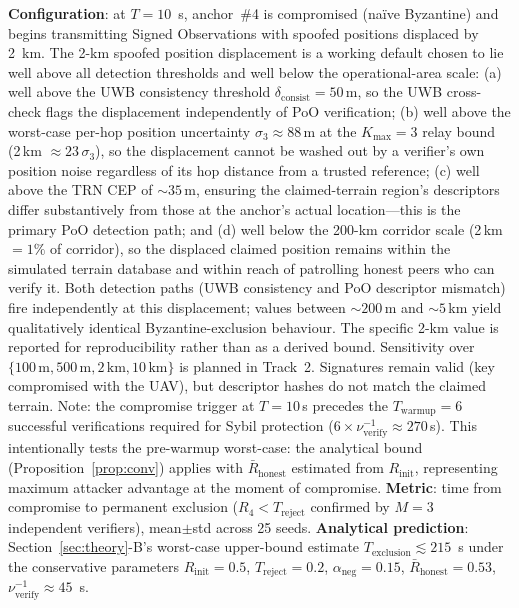 \documentclass[conference,10pt]{IEEEtran}
\begin{document}
\textbf{Configuration}: at $T{=}10$~s, anchor~\#4 is compromised (na\"ive Byzantine) and begins transmitting Signed Observations with spoofed positions displaced by 2~km. The 2-km spoofed position displacement is a working default chosen to lie well above all detection thresholds and well below the operational-area scale: (a) well above the UWB consistency threshold $\delta_\text{consist}=50$\,m, so the UWB cross-check flags the displacement independently of PoO verification; (b) well above the worst-case per-hop position uncertainty $\sigma_3 \approx 88$\,m at the $K_\text{max}=3$ relay bound (2\,km $\approx 23\,\sigma_3$), so the displacement cannot be washed out by a verifier's own position noise regardless of its hop distance from a trusted reference; (c) well above the TRN CEP of $\sim 35$\,m, ensuring the claimed-terrain region's descriptors differ substantively from those at the anchor's actual location---this is the primary PoO detection path; and (d) well below the 200-km corridor scale (2\,km $= 1\%$ of corridor), so the displaced claimed position remains within the simulated terrain database and within reach of patrolling honest peers who can verify it. Both detection paths (UWB consistency and PoO descriptor mismatch) fire independently at this displacement; values between $\sim 200$\,m and $\sim 5$\,km yield qualitatively identical Byzantine-exclusion behaviour. The specific 2-km value is reported for reproducibility rather than as a derived bound. Sensitivity over $\{100\,\text{m}, 500\,\text{m}, 2\,\text{km}, 10\,\text{km}\}$ is planned in Track~2. Signatures remain valid (key compromised with the UAV), but descriptor hashes do not match the claimed terrain. Note: the compromise trigger at $T=10$\,s precedes the $T_\text{warmup}=6$ successful verifications required for Sybil protection ($6\times \nu_\text{verify}^{-1}\approx 270$\,s). This intentionally tests the pre-warmup worst-case: the analytical bound (Proposition~\ref{prop:conv}) applies with $\bar{R}_\text{honest}$ estimated from $R_\text{init}$, representing maximum attacker advantage at the moment of compromise.
\textbf{Metric}: time from compromise to permanent exclusion ($R_4 < T_\text{reject}$ confirmed by $M{=}3$ independent verifiers), mean$\pm$std across 25 seeds.
\textbf{Analytical prediction}: Section~\ref{sec:theory}-B's worst-case upper-bound estimate $T_\text{exclusion}\lesssim 215$~s under the conservative parameters $R_\text{init}{=}0.5$, $T_\text{reject}{=}0.2$, $\alpha_\text{neg}{=}0.15$, $\bar{R}_\text{honest}=0.53$, $\nu_\text{verify}^{-1}\!\approx\!45$~s.
\end{document}
